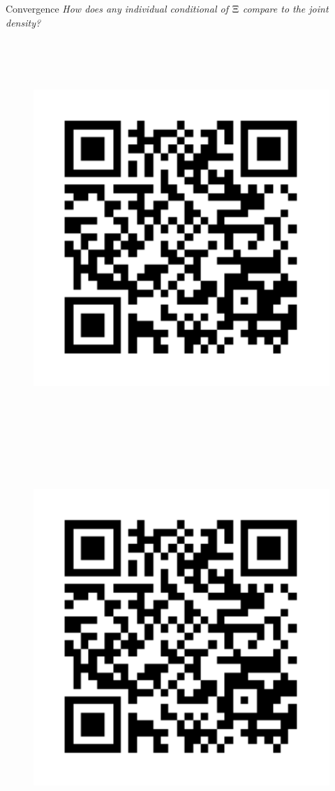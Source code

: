 \begin{block}{Convergence}
\large
    \emph{How does any individual conditional of $\operatorname*{\Xi}$ compare to the joint density?}

    \begin{figure}
        \includegraphics[height=15cm]{ref1}
        \includegraphics[height=15cm]{ref1}
    \end{figure}

\end{block}
\vspace{-1cm}
